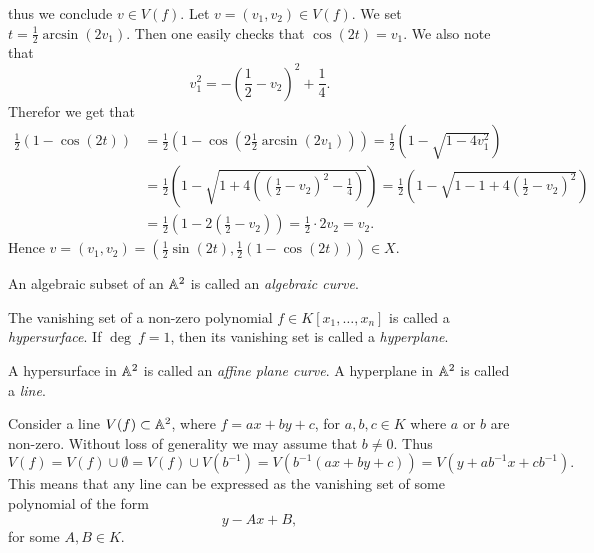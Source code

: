 \begin{example}
\begin{enumerate}
        thus we conclude $v\in V(f).$ Let $v=(v_1,v_2)\in V(f)$. We set $t=\frac{1}{2}\arcsin(2v_1)$. Then one easily checks that $\cos(2t)=v_1$. We also note that 
        $$v_1^2=-\left(\frac{1}{2}-v_2\right)^2+\frac{1}{4}.$$
        Therefor we get that
        \begin{align*}
        \frac{1}{2}(1-\cos(2t))&=\frac{1}{2}\left(1-\cos\left(2\frac{1}{2}\arcsin(2v_1)\right)\right) = \frac{1}{2}\left(1-\sqrt{1-4v_1^2}\right)\\
        &=\frac{1}{2}\left(1 -\sqrt{1+4\left(\left(\frac{1}{2}-v_2\right)^2-\frac{1}{4} \right)} \right)=\frac{1}{2}\left(1-\sqrt{1-1+4\left(\frac{1}{2}-v_2\right)^2}\right)\\
        &= \frac{1}{2}\left(1-2\left(\frac{1}{2}-v_2\right) \right)=\frac{1}{2}\cdot 2v_2=v_2.
        \end{align*}
        \noindent Hence $v=(v_1,v_2)=\left(\frac{1}{2}\sin\left(2t\right),\frac{1}{2}\left(1-\cos\left(2t\right)\right) \right)\in X$.
    \end{enumerate}
\end{example}

\begin{definition}
    An algebraic subset of an $\mathbb{A}^2$ is called an \textit{algebraic curve}.
\end{definition}
\begin{definition}
    The vanishing set of a non-zero polynomial $f\in K[x_1,\dots,x_n]$ is called a \textit{hypersurface}. If $\deg \ f = 1$, then its vanishing set is called a \textit{hyperplane}. 
\end{definition}
\begin{definition}
    A hypersurface in $\mathbb{A}^2$ is called an \textit{affine plane curve}. A hyperplane in $\mathbb{A}^2$ is called a \textit{line}.
\end{definition}
\begin{remark}
    Consider a line $V(f)\subset \mathbb{A}^2$, where $f=ax+by+c$, for $a,b,c\in K$ where $a$ or $b$ are non-zero. Without loss of generality we may assume that $b\neq 0$. Thus 
    $$V(f)= V(f)\cup \emptyset = V(f)\cup V\left(b^{-1}\right) = V\left(b^{-1}(ax+by+c)\right)=V\left(y+ab^{-1}x+cb^{-1}\right).$$
    This means that any line can be expressed as the vanishing set of some polynomial of the form 
    $$y-Ax+B,$$
    for some $A,B\in K.$
\end{remark}

